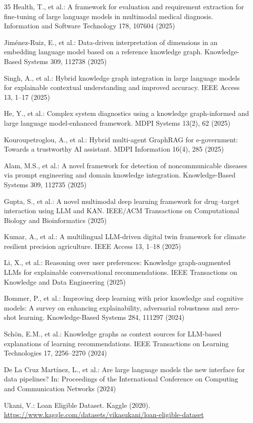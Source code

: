 \documentclass[lnbip]{svmultln}
\begin{document}
\begin{thebibliography}{35}
 Health, T., et al.: A framework for evaluation and requirement extraction for fine-tuning of large language models in multimodal medical diagnosis. Information and Software Technology 178, 107604 (2025)

 Jim\'{e}nez-Ruiz, E., et al.: Data-driven interpretation of dimensions in an embedding language model based on a reference knowledge graph. Knowledge-Based Systems 309, 112738 (2025)

 Singh, A., et al.: Hybrid knowledge graph integration in large language models for explainable contextual understanding and improved accuracy. IEEE Access 13, 1--17 (2025)

 He, Y., et al.: Complex system diagnostics using a knowledge graph-informed and large language model-enhanced framework. MDPI Systems 13(2), 62 (2025)

 Kouroupetroglou, A., et al.: Hybrid multi-agent GraphRAG for e-government: Towards a trustworthy AI assistant. MDPI Information 16(4), 285 (2025)

 Alam, M.S., et al.: A novel framework for detection of noncommunicable diseases via prompt engineering and domain knowledge integration. Knowledge-Based Systems 309, 112735 (2025)

 Gupta, S., et al.: A novel multimodal deep learning framework for drug--target interaction using LLM and KAN. IEEE/ACM Transactions on Computational Biology and Bioinformatics (2025)

 Kumar, A., et al.: A multilingual LLM-driven digital twin framework for climate resilient precision agriculture. IEEE Access 13, 1--18 (2025)

 Li, X., et al.: Reasoning over user preferences: Knowledge graph-augmented LLMs for explainable conversational recommendations. IEEE Transactions on Knowledge and Data Engineering (2025)

 Bommer, P., et al.: Improving deep learning with prior knowledge and cognitive models: A survey on enhancing explainability, adversarial robustness and zero-shot learning. Knowledge-Based Systems 284, 111297 (2024)

 Sch\"{o}n, E.M., et al.: Knowledge graphs as context sources for LLM-based explanations of learning recommendations. IEEE Transactions on Learning Technologies 17, 2256--2270 (2024)

 De La Cruz Mart\'{i}nez, L., et al.: Are large language models the new interface for data pipelines? In: Proceedings of the International Conference on Computing and Communication Networks (2024)

 Ukani, V.: Loan Eligible Dataset. Kaggle (2020). \url{https://www.kaggle.com/datasets/vikasukani/loan-eligible-dataset}

\end{thebibliography}
\end{document}
